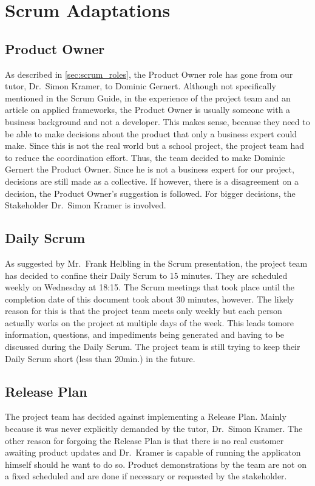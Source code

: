 \section{Scrum Adaptations}
\subsection{Product Owner}
As described in \autoref{sec:scrum_roles}, the Product Owner role has gone from our tutor, Dr.\ Simon Kramer, to Dominic Gernert. Although not specifically mentioned in the Scrum Guide\cite{scrum_guide}, in the experience
of the project team and an article on applied frameworks\cite{applied_frameworks_po}, the Product Owner is usually someone with a business background and not a developer. This makes sense, because they need to be able to make decisions about the product that only a business
expert could make. Since this is not the real world but a school project, the project team had to reduce the coordination effort. Thus, the team decided to make Dominic Gernert the Product Owner. Since he is
not a business expert for our project, decisions are still made as a collective. If however, there is a disagreement on a decision, the Product Owner's suggestion is followed. For bigger decisions,
the Stakeholder Dr.\ Simon Kramer is involved.
\subsection{Daily Scrum}
As suggested by Mr.\ Frank Helbling in the Scrum presentation\cite{helbling_scrum3}, the project team has decided to confine their Daily Scrum to 15 minutes. They are scheduled weekly on Wednesday at 18:15.
The Scrum meetings that took place until the completion date of this document took about 30 minutes, however. The likely reason for this is that the project team meets only weekly
but each person actually works on the project at multiple days of the week. This leads tomore information, questions, and impediments being generated and having to be discussed during the Daily Scrum.
The project team is still trying to keep their Daily Scrum short (less than 20min.) in the future.
\subsection{Release Plan}
The project team has decided against implementing a Release Plan. Mainly because it was never explicitly demanded by the tutor, Dr.\ Simon Kramer. The other reason for forgoing the Release Plan is that
there is no real customer awaiting product updates and Dr.\ Kramer is capable of running the applicaton himself should he want to do so. Product demonstrations by the team are not on a fixed scheduled and
are done if necessary or requested by the stakeholder.
